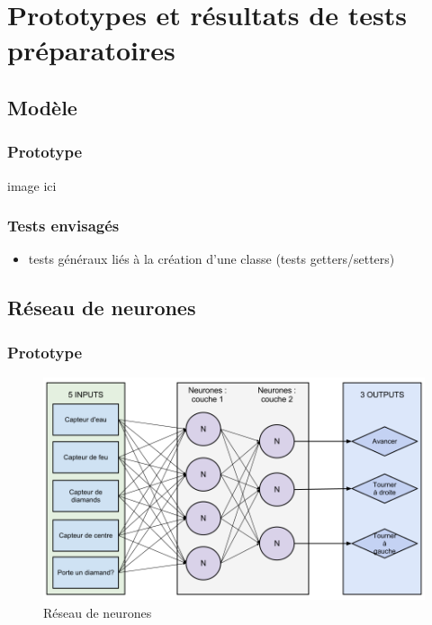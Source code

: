 \chapter{Prototypes et résultats de tests préparatoires}


\section{Modèle}
\subsection{Prototype}
image ici

\subsection{Tests envisagés}
\begin{itemize}
  \item tests généraux liés à la création d'une classe (tests getters/setters) \\

\end{itemize}


\section{Réseau de neurones}
\subsection{Prototype}
\begin{figure}[H]
    \centering
    \includegraphics[width=1\textwidth]{./pictures/notre_reseau_neurones.png}
    \caption{Réseau de neurones}
\end{figure}


